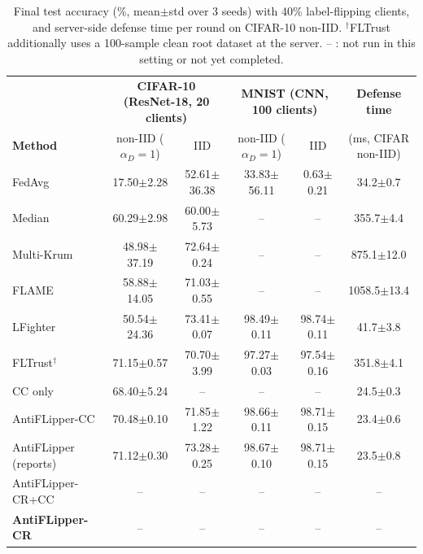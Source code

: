 \begin{table}[t]
\centering
\caption{Final test accuracy (\%, mean$\pm$std over 3 seeds) with 40\% label-flipping clients, and server-side defense time per round on CIFAR-10 non-IID. $^\dagger$FLTrust additionally uses a 100-sample clean root dataset at the server. -- : not run in this setting or not yet completed.}
\label{tab:headline}
\renewcommand{\arraystretch}{1.12}
\small
\begin{tabular}{l|cc|cc|c}
\hline
& \multicolumn{2}{c|}{\textbf{CIFAR-10 (ResNet-18, 20 clients)}} & \multicolumn{2}{c|}{\textbf{MNIST (CNN, 100 clients)}} & \textbf{Defense time} \\
\textbf{Method} & non-IID ($\alpha_D{=}1$) & IID & non-IID ($\alpha_D{=}1$) & IID & (ms, CIFAR non-IID) \\
\hline
FedAvg & 17.50$\pm$2.28 & 52.61$\pm$36.38 & 33.83$\pm$56.11 & 0.63$\pm$0.21 & 34.2$\pm$0.7 \\
Median & 60.29$\pm$2.98 & 60.00$\pm$5.73 & -- & -- & 355.7$\pm$4.4 \\
Multi-Krum & 48.98$\pm$37.19 & 72.64$\pm$0.24 & -- & -- & 875.1$\pm$12.0 \\
FLAME & 58.88$\pm$14.05 & 71.03$\pm$0.55 & -- & -- & 1058.5$\pm$13.4 \\
LFighter & 50.54$\pm$24.36 & 73.41$\pm$0.07 & 98.49$\pm$0.11 & 98.74$\pm$0.11 & 41.7$\pm$3.8 \\
FLTrust$^\dagger$ & 71.15$\pm$0.57 & 70.70$\pm$3.99 & 97.27$\pm$0.03 & 97.54$\pm$0.16 & 351.8$\pm$4.1 \\
\hline
CC only & 68.40$\pm$5.24 & -- & -- & -- & 24.5$\pm$0.3 \\
AntiFLipper-CC & 70.48$\pm$0.10 & 71.85$\pm$1.22 & 98.66$\pm$0.11 & 98.71$\pm$0.15 & 23.4$\pm$0.6 \\
AntiFLipper (reports) & 71.12$\pm$0.30 & 73.28$\pm$0.25 & 98.67$\pm$0.10 & 98.71$\pm$0.15 & 23.5$\pm$0.8 \\
AntiFLipper-CR+CC & -- & -- & -- & -- & -- \\
\textbf{AntiFLipper-CR} & -- & -- & -- & -- & -- \\
\hline
\end{tabular}
\end{table}
